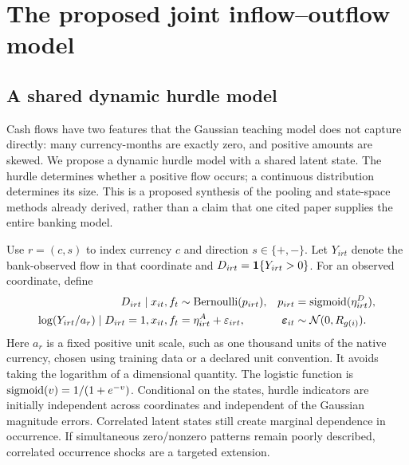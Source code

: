 \chapter{The proposed joint inflow--outflow model}
\label{ch:joint}
\section{A shared dynamic hurdle model}
Cash flows have two features that the Gaussian teaching model does not capture directly: many currency-months are exactly zero, and positive amounts are skewed. We propose a dynamic hurdle model with a shared latent state. The hurdle determines whether a positive flow occurs; a continuous distribution determines its size. This is a proposed synthesis of the pooling and state-space methods already derived, rather than a claim that one cited paper supplies the entire banking model.

Use $r=(c,s)$ to index currency $c$ and direction $s\in\{+,-\}$. Let $Y_{irt}$ denote the bank-observed flow in that coordinate and $D_{irt}=\mathbf 1\{Y_{irt}>0\}$. For an observed coordinate, define
\begin{align}
D_{irt}\mid x_{it},f_t&\sim\operatorname{Bernoulli}(p_{irt}),
&p_{irt}&=\operatorname{sigmoid}(\eta^D_{irt}),\\
\log(Y_{irt}/a_r)\mid D_{irt}=1,x_{it},f_t
&=\eta^A_{irt}+\varepsilon_{irt},
&\bm\varepsilon_{it}&\sim\mathcal N(0,R_{g(i)}).
\label{eq:hurdle}
\end{align}
Here $a_r$ is a fixed positive unit scale, such as one thousand units of the native currency, chosen using training data or a declared unit convention. It avoids taking the logarithm of a dimensional quantity. The logistic function is $\operatorname{sigmoid}(v)=1/(1+e^{-v})$. Conditional on the states, hurdle indicators are initially independent across coordinates and independent of the Gaussian magnitude errors. Correlated latent states still create marginal dependence in occurrence. If simultaneous zero/nonzero patterns remain poorly described, correlated occurrence shocks are a targeted extension.

